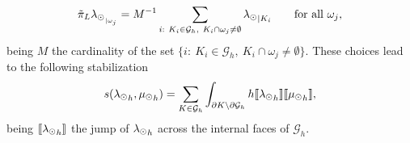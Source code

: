 \begin{equation*}
\tilde{\pi}_L {\lambda_{\odot}}_{ _{|\omega _j}} = M^{-1} \sum_{\substack{i: \ K_i \in \mathcal{G}_h, \  K_i \cap \omega_j \neq \emptyset}} {\lambda_{\odot}}_{|K_i} \qquad \text{for all $\omega_j$,} 
\end{equation*}
being $M$ the cardinality of the set $\{i: \ K_i \in \mathcal{G}_h, \  K_i \cap \omega_j \neq \emptyset\}$. These choices lead to the following stabilization 
\begin{equation}\label{eq:stab}
s({\ld}_h, {\md}_h)= \sum _{K\in \mathcal{G}_{h}} \int_{\partial K\setminus \partial \mathcal{G}_{h}} h \llbracket {\ld}_h \rrbracket \llbracket {\md}_h \rrbracket,
\end{equation}
being $\llbracket {\lambda_{\odot}}_h \rrbracket$ the jump of ${\lambda_{\odot}}_h$ across the internal faces of $\mathcal{G}_h$.

